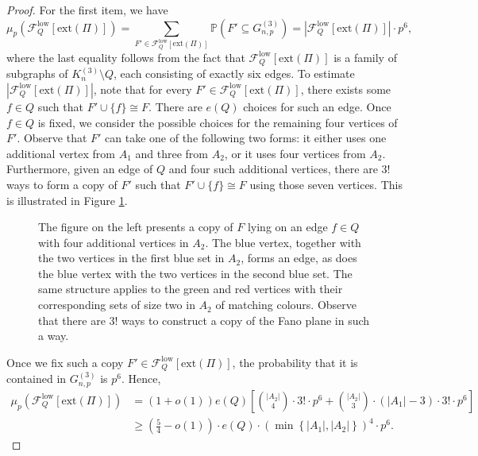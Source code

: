 \documentclass[10pt,a4paper]{amsart}
\newcommand{\Gnp}{G_{n, p}^{(3)}}
\renewcommand{\Pr}{\mathbb{P}}
\newcommand{\cF}{\mathcal{F}}
\newcommand{\cFQL}{\cF_Q^{\mathrm{low}}}
\newcommand{\ext}{\mathrm{ext}}
\renewcommand{\ge}{\geqslant}
\begin{document}
\begin{proof}
    For the first item, we have 
    \[
        \mu_p\left(\cFQL[\ext(\Pi)]\right) = \sum_{F' \in \cFQL[\ext(\Pi)]} \Pr\left(F' \subseteq \Gnp\right) = \left|\cFQL[\ext(\Pi)]\right| \cdot p^6,
    \]
    where the last equality follows from the fact that $\cFQL[\ext(\Pi)]$ is a family of subgraphs of $K_n^{(3)} \setminus Q$, each consisting of exactly six edges. To estimate $\left|\cFQL[\ext(\Pi)]\right|$, note that for every $F' \in \cFQL[\ext(\Pi)]$, there exists some $f \in Q$ such that $F' \cup \{f\} \cong F$. There are $e(Q)$ choices for such an edge. Once $f \in Q$ is fixed, we consider the possible choices for the remaining four vertices of $F'$. Observe that $F'$ can take one of the following two forms:
    it either uses one additional vertex from $A_1$ and  three from $A_2$, or it uses four vertices from $A_2$. Furthermore, given an edge of $Q$ and four such additional vertices, there are $3!$ ways to form a copy of $F'$ such that $F' \cup \{f\} \cong F$ using those seven vertices. This is illustrated in Figure \ref{figure:copies of F}.
    
\begin{figure}[h]
    \centering
           
    \caption{The figure on the left presents a copy of $F$ lying on an edge $f \in Q$ with four additional vertices in $A_2$. The blue vertex, together with the two vertices in the first blue set in $A_2$, forms an edge, as does the blue vertex with the two vertices in the second blue set. The same structure applies to the green and red vertices with their corresponding sets of size two in $A_2$ of matching colours. Observe that there are $3!$ ways to construct a copy of the Fano plane in such a way.}
    \label{figure:copies of F}
\end{figure}

    
    Once we fix such a copy $F' \in \cFQL[\ext(\Pi)]$, the probability that it is contained in $\Gnp$ is $p^6$.   
    Hence,
    \begin{align*}
        \mu_p\left(\cFQL[\ext(\Pi)]\right) &= (1+o(1)) e(Q) \left[\binom{|A_2|}{4} \cdot 3! \cdot p^6 + \binom{|A_2|}{3} \cdot (|A_1| - 3) \cdot 3! \cdot p^6\right] \\
        &\ge \left(\frac{5}{4} - o(1)\right) \cdot e(Q) \cdot \left(\min\left\{|A_1|, |A_2|\right\}\right)^{4} \cdot p^6.
    \end{align*}    


\end{proof}
\end{document}
